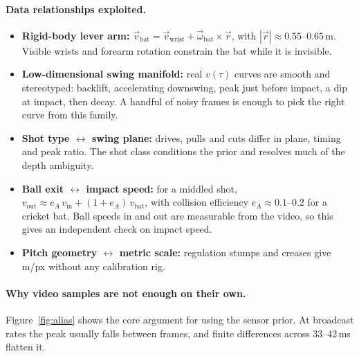 \documentclass[11pt,a4paper]{article}
\begin{document}
\paragraph{Data relationships exploited.}
\begin{itemize}
  \item \textbf{Rigid-body lever arm:} $\vec v_{\text{bat}}=\vec v_{\text{wrist}}+\vec\omega_{\text{bat}}\times\vec r$, with $|\vec r|\approx0.55$--$0.65$\,m. Visible wrists and forearm rotation constrain the bat while it is invisible.
  \item \textbf{Low-dimensional swing manifold:} real $v(\tau)$ curves are smooth and stereotyped: backlift, accelerating downswing, peak just before impact, a dip at impact, then decay. A handful of noisy frames is enough to pick the right curve from this family.
  \item \textbf{Shot type $\leftrightarrow$ swing plane:} drives, pulls and cuts differ in plane, timing and peak ratio. The shot class conditions the prior and resolves much of the depth ambiguity.
  \item \textbf{Ball exit $\leftrightarrow$ impact speed:} for a middled shot, $v_{\text{out}}\approx e_A\,v_{\text{in}}+(1+e_A)\,v_{\text{bat}}$, with collision efficiency $e_A\approx0.1$--$0.2$ for a cricket bat. Ball speeds in and out are measurable from the video, so this gives an independent check on impact speed.
  \item \textbf{Pitch geometry $\leftrightarrow$ metric scale:} regulation stumps and creases give m/px without any calibration rig.
\end{itemize}

\paragraph{Why video samples are not enough on their own.}
Figure~\ref{fig:alias} shows the core argument for using the sensor prior. At broadcast rates the peak usually falls between frames, and finite differences across 33--42\,ms flatten it.
\end{document}
